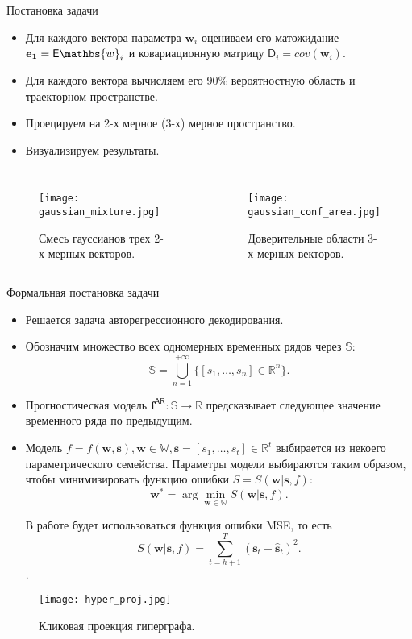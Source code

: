 \documentclass{beamer}
\begin{document}
\begin{frame}{Постановка задачи}
\begin{itemize}
    \item Для каждого вектора-параметра $\mathbf{w}_i$ оцениваем его матожидание $\mathbf{e_1} = \mathsf{E}\mathbs{w}_i$ и ковариационную матрицу $\mathsf{D}_i = cov(\mathbf{w}_i)$.
    \item Для каждого вектора вычисляем его $90\%$ вероятностную область и траекторном пространстве.
    \item Проецируем на 2-х мерное (3-х) мерное пространство.
    \item Визуализируем результаты.
\end{itemize}

\begin{columns}

    \begin{figure}
    \texttt{[image: gaussian\_mixture.jpg]}
    \caption{Смесь гауссианов трех 2-х мерных векторов.}
    \end{figure}

    \begin{figure}
    \texttt{[image: gaussian\_conf\_area.jpg]}
    \caption{Доверительные области 3-х мерных векторов.}
    \end{figure}

\end{columns}
\end{frame}




\begin{frame}{Формальная постановка задачи}
\begin{itemize}
    \item Решается задача авторегрессионного декодирования.
    \item Обозначим множество всех одномерных временных рядов через $\mathbb{S}$: \[\mathbb{S} = \bigcup\limits_{n=1}^{+\infty}\{[s_1, \dots, s_n] \in \mathbb{R}^{n}\}.\]
    \item Прогностическая модель $\mathbf{f}^{\mathsf{AR}}: \mathbb{S} \to \mathbb{R}$ предсказывает следующее значение временного ряда по предыдущим.
    \item Модель $f = f(\mathbf{w}, \mathbf{s}), \mathbf{w} \in \mathbb{W}, \mathbf{s}=[s_1, \dots, s_t]\in \mathbb{R}^t$ выбирается из некоего параметрического семейства.
Параметры модели выбираются таким образом, чтобы минимизировать функцию ошибки $S=S(\mathbf{w}|\mathbf{s},f)$:
$$
\mathbf{w^*} = \arg \min \limits_{\mathbf{w} \in \mathbb{W}} S(\mathbf{w}|\mathbf{s},f).
$$


В работе будет использоваться функция ошибки MSE, то есть 
$$
S(\mathbf{w}|\mathbf{s},f) = \sum\limits_{t=h+1}^{T}(\mathbf{s}_t - \hat{\mathbf{s}}_t)^2.
$$.
\end{itemize}
\begin{figure}
\texttt{[image: hyper\_proj.jpg]}
\caption{Кликовая проекция гиперграфа.}
\end{figure}
\end{frame}
\end{document}
